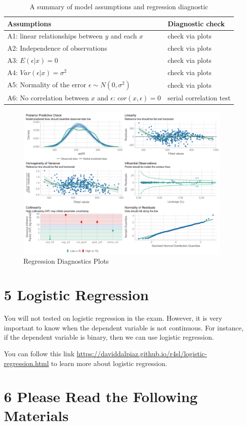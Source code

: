 \documentclass[11pt]{article}
\theoremstyle{definition}
\begin{document}
\begin{table}[!htb]
  \centering
  \begin{tabular}{ll}
    \hline 
    \hline 
    Assumptions & Diagnostic check \\ 
    \hline 
    A1: linear relationships between $y$ and each $x$ & check via plots\\
    A2: Independence of observations & check via plots  \\
    A3: $E(\epsilon | x) = 0$ & check via plots \\ 
    A4: $Var(\epsilon | x) = \sigma^2$ & check via plots  \\
    A5: Normality of the error $\epsilon \sim N(0, \sigma^2)$ & check via plots  \\
    A6: No correlation between $x$ and $\epsilon$: $cor(x, \epsilon)=0$ & serial correlation test \\ 
    \hline 
  \end{tabular}
  \caption{A summary of model assumptions and regression diagnostic}
\end{table}


\begin{figure}[!htbp]
  \centering
  \includegraphics[width=0.95\textwidth]{./figures/reg_figure4.png}
  \caption{Regression Diagnostics Plots}
\end{figure}


\section{5 Logistic Regression}

You will not tested on logistic regression in the exam. However, it is very important
to know when the dependent variable is not continuous. For instance, if the dependent
variable is binary, then we can use logistic regression.

You can follow this link \url{https://daviddalpiaz.github.io/r4sl/logistic-regression.html}
to learn more about logistic regression.


\section{6 Please Read the Following Materials}
\end{document}

